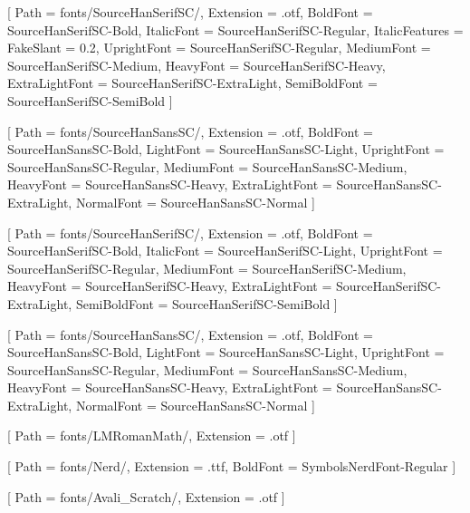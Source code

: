 \setlength{\parindent}{2em} %

\setmainfont{SourceHanSerifSC-Regular}[
	Path = fonts/SourceHanSerifSC/,
	Extension = .otf,
	BoldFont = SourceHanSerifSC-Bold,
	ItalicFont = SourceHanSerifSC-Regular,
	ItalicFeatures = {FakeSlant = 0.2},
	UprightFont = SourceHanSerifSC-Regular,
	MediumFont = SourceHanSerifSC-Medium,
	HeavyFont = SourceHanSerifSC-Heavy,
	ExtraLightFont = SourceHanSerifSC-ExtraLight,
	SemiBoldFont = SourceHanSerifSC-SemiBold
]

\setsansfont{SourceHanSansSC-Regular}[
	Path = fonts/SourceHanSansSC/,
	Extension = .otf,
	BoldFont = SourceHanSansSC-Bold,
	LightFont = SourceHanSansSC-Light,
	UprightFont = SourceHanSansSC-Regular,
	MediumFont = SourceHanSansSC-Medium,
	HeavyFont = SourceHanSansSC-Heavy,
	ExtraLightFont = SourceHanSansSC-ExtraLight,
	NormalFont = SourceHanSansSC-Normal
]

[
	Path = fonts/SourceHanSerifSC/,
	Extension = .otf,
	BoldFont = SourceHanSerifSC-Bold,
	ItalicFont = SourceHanSerifSC-Light,
	UprightFont = SourceHanSerifSC-Regular,
	MediumFont = SourceHanSerifSC-Medium,
	HeavyFont = SourceHanSerifSC-Heavy,
	ExtraLightFont = SourceHanSerifSC-ExtraLight,
	SemiBoldFont = SourceHanSerifSC-SemiBold
]

[
	Path = fonts/SourceHanSansSC/,
	Extension = .otf,
	BoldFont = SourceHanSansSC-Bold,
	LightFont = SourceHanSansSC-Light,
	UprightFont = SourceHanSansSC-Regular,
	MediumFont = SourceHanSansSC-Medium,
	HeavyFont = SourceHanSansSC-Heavy,
	ExtraLightFont = SourceHanSansSC-ExtraLight,
	NormalFont = SourceHanSansSC-Normal
]

[
	Path = fonts/LMRomanMath/,
	Extension = .otf
]

\newfontfamily{}[
	Path = fonts/Nerd/,
	Extension = .ttf,
	BoldFont = SymbolsNerdFont-Regular
]

\newfontfamily{}[
	Path = fonts/Avali_Scratch/,
	Extension = .otf
]
